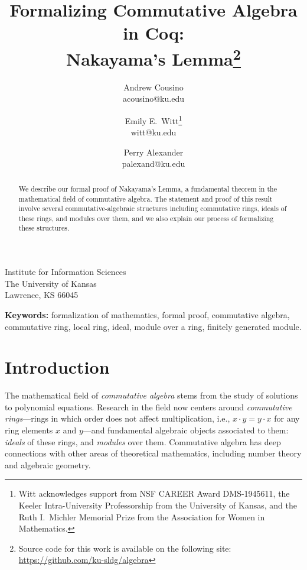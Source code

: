 \documentclass{article}
\begin{document}
\title{ 
Formalizing Commutative Algebra in Coq: \\
Nakayama's Lemma\thanks{Source code for this work is available on the following
site: \url{https://github.com/ku-sldg/algebra}}
}

\date{}

\author{ 
	Andrew Cousino \\ {\ttfamily acousino@ku.edu}
	\and 
	Emily E.\ Witt\thanks{Witt acknowledges support from NSF CAREER Award
    DMS-1945611, the Keeler Intra-University Professorship from the University of Kansas, and the Ruth I.\, Michler Memorial Prize from the
    Association for Women in Mathematics.} \\ {\ttfamily witt@ku.edu}
  \and 
	Perry Alexander \\ {\ttfamily palexand@ku.edu}
}	

\maketitle	

\vspace{-1cm}

{\large
\begin{center}
	Institute for Information Sciences \\
	The University of Kansas \\
	Lawrence, KS 66045
\end{center}
}


\begin{abstract}
  We describe our formal proof of Nakayama's Lemma, a fundamental theorem in
  the mathematical field of commutative algebra. The statement and proof of
  this result involve several commutative-algebraic structures including
  commutative rings, ideals of these rings, and modules over them, and we also
  explain our process of formalizing these structures.
\end{abstract}

\noindent \textbf{Keywords:}
formalization of mathematics,
formal proof,
commutative algebra,
commutative ring,
local ring,
ideal,
module over a ring,
finitely generated module. 

\section{Introduction}
The mathematical field of \emph{commutative algebra} stems from the study of
solutions to polynomial equations. Research in the field now centers around
\emph{commutative rings}---rings in which order does not affect multiplication,
i.e., $x \cdot y = y \cdot x$ for any ring elements $x$ and $y$---and
fundamental algebraic objects associated to them:  \emph{ideals} of these
rings, and \emph{modules} over them. Commutative algebra has deep connections
with other areas of theoretical mathematics, including number theory and
algebraic geometry. 
\end{document}

